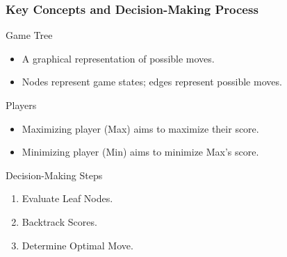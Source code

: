 \documentclass[aspectratio=169]{beamer}
\begin{document}
\begin{frame}
    \frametitle{Key Concepts and Decision-Making Process}
    \begin{block}{Game Tree}
        \begin{itemize}
            \item A graphical representation of possible moves.
            \item Nodes represent game states; edges represent possible moves.
        \end{itemize}
    \end{block}

    \begin{block}{Players}
        \begin{itemize}
            \item Maximizing player (Max) aims to maximize their score.
            \item Minimizing player (Min) aims to minimize Max's score.
        \end{itemize}
    \end{block}
    
    \begin{block}{Decision-Making Steps}
        \begin{enumerate}
            \item Evaluate Leaf Nodes.
            \item Backtrack Scores.
            \item Determine Optimal Move.
        \end{enumerate}
    \end{block}
\end{frame}
\end{document}
